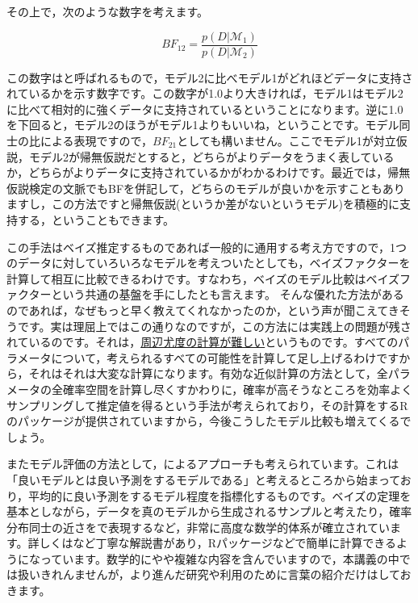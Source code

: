 \documentclass{ltjsbook}
\begin{document}
その上で，次のような数字を考えます。

\[ BF_{12} = \frac{p(D| \mathcal{M}_1)}{p(D| \mathcal{M}_2)} \]

この数字はと呼ばれるもので，モデル2に比べモデル1がどれほどデータに支持されているかを示す数字です。この数字が1.0より大きければ，モデル1はモデル2に比べて相対的に強くデータに支持されているということになります。逆に1.0を下回ると，モデル2のほうがモデル1よりもいいね，ということです。モデル同士の比による表現ですので，$BF_{21}$としても構いません。ここでモデル1が対立仮説，モデル2が帰無仮説だとすると，どちらがよりデータをうまく表しているか，どちらがよりデータに支持されているかがわかるわけです。最近では，帰無仮説検定の文脈でもBFを併記して，どちらのモデルが良いかを示すこともありますし，この方法ですと帰無仮説(というか差がないというモデル)を積極的に支持する，ということもできます。

この手法はベイズ推定するものであれば一般的に通用する考え方ですので，1つのデータに対していろいろなモデルを考えついたとしても，ベイズファクターを計算して相互に比較できるわけです。すなわち，ベイズのモデル比較はベイズファクターという共通の基盤を手にしたとも言えます。
そんな優れた方法があるのであれば，なぜもっと早く教えてくれなかったのか，という声が聞こえてきそうです。実は理屈上ではこの通りなのですが，この方法には実践上の問題が残されているのです。それは，\underline{周辺尤度の計算が難しい}というものです。すべてのパラメータについて，考えられるすべての可能性を計算して足し上げるわけですから，それはそれは大変な計算になります。有効な近似計算の方法として，全パラメータの全確率空間を計算し尽くすかわりに，確率が高そうなところを効率よくサンプリングして推定値を得るという手法が考えられており，その計算をするRのパッケージ\textcite{bridgesampling}が提供されていますから，今後こうしたモデル比較も増えてくるでしょう。

またモデル評価の方法として，によるアプローチも考えられています。これは「良いモデルとは良い予測をするモデルである」と考えるところから始まっており，平均的に良い予測をするモデル程度を指標化するものです。ベイズの定理を基本としながら，データを真のモデルから生成されるサンプルと考えたり，確率分布同士の近さをで表現するなど，非常に高度な数学的体系が確立されています。詳しくは\textcite{Hamada201912}など丁寧な解説書があり，Rパッケージなどで簡単に計算できるようになっています\textcite{loo}。数学的にやや複雑な内容を含んでいますので，本講義の中では扱いきれんませんが，より進んだ研究や利用のために言葉の紹介だけはしておきます。
\end{document}
